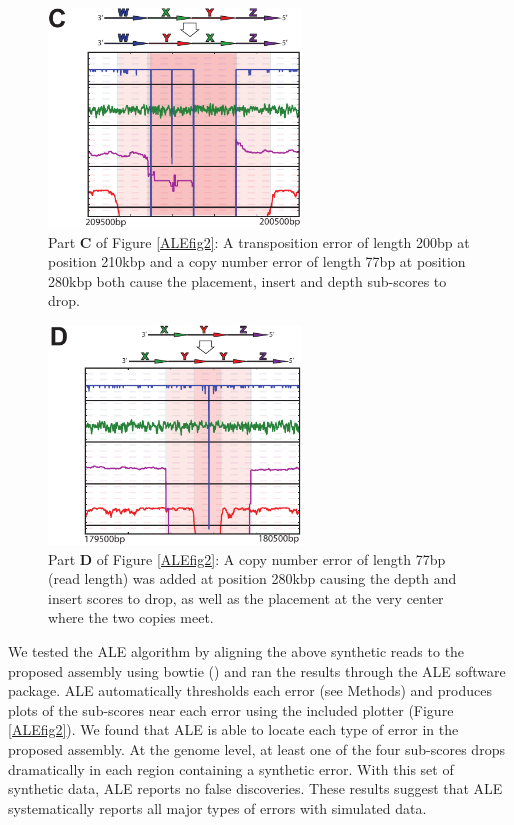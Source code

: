 \documentclass[phd,tocprelim]{cornell}
\begin{document}
\begin{figure}[hptb]%
    \centerline{\includegraphics[width=0.6\textwidth]{figures/ALE/fig2_bot_p3.pdf}}
    \caption[ALE performance: synthetic transposition]{Part {\bf C} of Figure \ref{ALEfig2}: A transposition error of length 200bp at position 210kbp and a copy number error of length 77bp at position 280kbp both cause the placement, insert and depth sub-scores to drop.}\label{ALEfig2p3}
\end{figure}

\begin{figure}[hptb]%
    \centerline{\includegraphics[width=0.6\textwidth]{figures/ALE/fig2_bot_p4.pdf}}
    \caption[ALE performance: synthetic copy number error]{Part {\bf D} of Figure \ref{ALEfig2}: A copy number error of length 77bp (read length) was added at position 280kbp causing the depth and insert scores to drop, as well as the placement at the very center where the two copies meet.}\label{ALEfig2p4}
\end{figure}

We tested the ALE algorithm by aligning the above synthetic reads to the proposed assembly using bowtie (\cite{Langmead2009}) and ran the results through the ALE software package. ALE automatically thresholds each error (see Methods) and produces plots of the sub-scores near each error using the included plotter (Figure \ref{ALEfig2}). We found that ALE is able to locate each type of error in the proposed assembly. At the genome level, at least one of the four sub-scores drops dramatically in each region containing a synthetic error. With this set of synthetic data, ALE reports no false discoveries. These results suggest that ALE systematically reports all major types of errors with simulated data.
\end{document}
